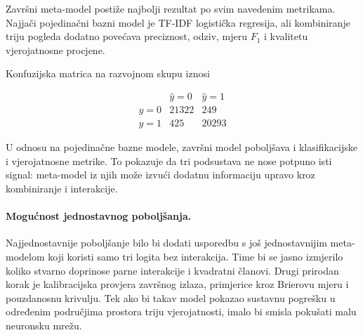Završni meta-model postiže najbolji rezultat po svim navedenim metrikama. Najjači pojedinačni bazni model je TF-IDF logistička regresija, ali kombiniranje triju pogleda dodatno povećava preciznost, odziv, mjeru $F_1$ i kvalitetu vjerojatnosne procjene.

Konfuzijska matrica na razvojnom skupu iznosi

\[
\begin{array}{c|cc}
 & \hat y=0 & \hat y=1 \\
\hline
y=0 & 21322 & 249 \\
y=1 & 425 & 20293
\end{array}
\]

U odnosu na pojedinačne bazne modele, završni model poboljšava i klasifikacijske i vjerojatnosne metrike. To pokazuje da tri podsustava ne nose potpuno isti signal: meta-model iz njih može izvući dodatnu informaciju upravo kroz kombiniranje i interakcije.

\paragraph{Mogućnost jednostavnog poboljšanja.}
Najjednostavnije poboljšanje bilo bi dodati usporedbu s još jednostavnijim meta-modelom koji koristi samo tri logita bez interakcija. Time bi se jasno izmjerilo koliko stvarno doprinose parne interakcije i kvadratni članovi. Drugi prirodan korak je kalibracijska provjera završnog izlaza, primjerice kroz Brierovu mjeru i pouzdanosnu krivulju. Tek ako bi takav model pokazao sustavnu pogrešku u određenim područjima prostora triju vjerojatnosti, imalo bi smisla pokušati malu neuronsku mrežu.